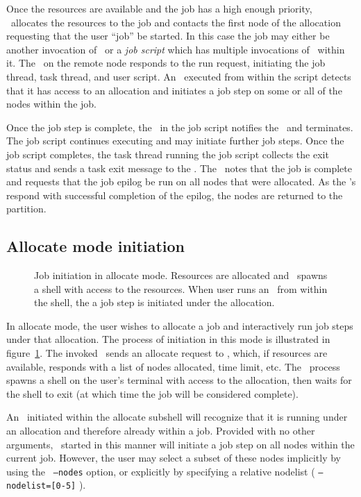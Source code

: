 Once the resources are available and the job has a high enough priority,
\slurmctld\ allocates the resources to the job and contacts the first node 
of the allocation requesting that the user ``job'' be started. In this case
the job may either be another invocation of \srun\ or a {\em job script} which
has multiple invocations of \srun\ within it. The \slurmd\ on the remote
node responds to the run request, initiating the job thread, task thread, 
and user script. An \srun\ executed from within the script detects that it
has access to an allocation and initiates a job step on some or all of the
nodes within the job.

Once the job step is complete, the \srun\ in the job script notifies the
\slurmctld\, and terminates. The job script continues executing and may
initiate further job steps. Once the job script completes, the task
thread running the job script collects the exit status and sends a task exit
message to the \slurmctld . The \slurmctld\ notes that the job is complete
and requests that the job epilog be run on all nodes that were allocated.
As the \slurmd 's respond with successful completion of the epilog, 
the nodes are returned to the partition.

\subsection{Allocate mode initiation}

\begin{figure}[tb]
\centerline{ }
\caption{\small Job initiation in allocate mode. Resources are allocated and
         \srun\ spawns a shell with access to the resources. When user runs 
	 an \srun\ from within the shell, the a job step is initiated under
	 the allocation.}
\label{init-allocate}
\end{figure}

In allocate mode, the user wishes to allocate a job and interactively run
job steps under that allocation. The process of initiation in this mode
is illustrated in figure~\ref{init-allocate}. The invoked \srun\ sends
an allocate request to \slurmctld , which, if resources are available,
responds with a list of nodes allocated, time limit, etc. The \srun\
process spawns a shell on the user's terminal with access to the
allocation,  then waits for the shell to exit (at which time the job
will be considered complete). 

An \srun\ initiated within the allocate subshell will recognize that it
is running under an allocation and therefore already within a job. Provided
with no other arguments, \srun\ started in this manner will initiate a job
step on all nodes within the current job. However, the user may select
a subset of these nodes implicitly by using the \srun\ {\tt --nodes}  
option, or explicitly by specifying a relative nodelist 
( {\tt --nodelist=[0-5]} ). 

